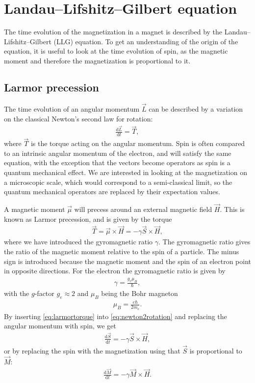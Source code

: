 \documentclass[12pt, a4paper, twoside, openright]{article}		%
\let\oldsection\section
\def\section{\cleardoublepage\oldsection}
\numberwithin{equation}{section}
\begin{document}
\section{Landau--Lifshitz--Gilbert equation} \label{sec:LLG}
The time evolution of the magnetization in a magnet is described by the Landau--Lifshitz--Gilbert (LLG) equation. To get an understanding of the origin of the equation, it is useful to look at the time evolution of spin, as the magnetic moment and therefore the magnetization is proportional to it. 

\subsection{Larmor precession}
The time evolution of an angular momentum $\vec{L}$ can be described by a variation on the classical Newton's second law for rotation:
\begin{align}
\label{eq:newton2rotation}
\frac{\textrm{d} \vec{L}}{\textrm{d} t} = \vec{T},
\end{align}
where $\vec{T}$ is the torque acting on the angular momentum. Spin is often compared to an intrinsic angular momentum of the electron, and will satisfy the same equation, with the exception that the vectors become operators as spin is a quantum mechanical effect. We are interested in looking at the magnetization on a microscopic scale, which would correspond to a semi-classical limit, so the quantum mechanical operators are replaced by their expectation values. 

A magnetic moment $\vec{\mu}$ will precess around an external magnetic field $\vec{H}$. This is known as Larmor precession, and is given by the torque
\begin{align}
\label{eq:larmortorque}
\vec{T} = \vec{\mu} \times \vec{H} = -\gamma \vec{S} \times \vec{H},
\end{align}
where we have introduced the gyromagnetic ratio $\gamma$. The gyromagnetic ratio gives the ratio of the magnetic moment relative to the spin of a particle. The minus sign is introduced because the magnetic moment and the spin of an electron point in opposite directions. For the electron the gyromagnetic ratio is given by
\begin{align}
\gamma = \frac{g_e\mu_B}{\hbar},
\end{align}
with the $g$-factor $g_e \approx 2$ and $\mu_B$ being the Bohr magneton
\begin{align}
\mu_B = \frac{e\hbar}{2m_e}.
\end{align}
By inserting \eqref{eq:larmortorque} into \eqref{eq:newton2rotation} and replacing the angular momentum with spin, we get
\begin{align}
\frac{\textrm{d} \vec{S}}{\textrm{d} t} =- \gamma \vec{S} \times \vec{H},
\end{align}
or by replacing the spin with the magnetization using that $\vec{S}$ is proportional to $\vec{M}$:
\begin{align}
\label{eq:mag_undamped}
\frac{\textrm{d} \vec{M}}{\textrm{d} t} = -\gamma \vec{M} \times \vec{H}.
\end{align}
\end{document}
